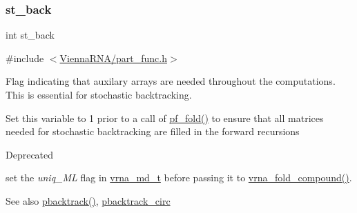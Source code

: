 \subsubsection{\texorpdfstring{st\+\_\+back}{st\_back}}
{\footnotesize\ttfamily int st\+\_\+back}



{\ttfamily \#include $<$\mbox{\hyperlink{part__func_8h}{Vienna\+R\+N\+A/part\+\_\+func.\+h}}$>$}



Flag indicating that auxilary arrays are needed throughout the computations. This is essential for stochastic backtracking. 

Set this variable to 1 prior to a call of \mbox{\hyperlink{group__pf__fold_gadc3db3d98742427e7001a7fd36ef28c2}{pf\+\_\+fold()}} to ensure that all matrices needed for stochastic backtracking are filled in the forward recursions

\begin{DoxyRefDesc}{Deprecated}
\item[\mbox{\hyperlink{deprecated__deprecated000102}{Deprecated}}]set the {\itshape uniq\+\_\+\+ML} flag in \mbox{\hyperlink{group__model__details_ga1f8a10e12a0a1915f2a4eff0b28ea17c}{vrna\+\_\+md\+\_\+t}} before passing it to \mbox{\hyperlink{group__fold__compound_ga6601d994ba32b11511b36f68b08403be}{vrna\+\_\+fold\+\_\+compound()}}.\end{DoxyRefDesc}


\begin{DoxySeeAlso}{See also}
\mbox{\hyperlink{group__subopt__stochbt_gac03ca6db186bb3bf0a2a326d7fb3ba03}{pbacktrack()}}, \mbox{\hyperlink{group__subopt__stochbt_ga00474051204ac9ad576b3e45174d03ff}{pbacktrack\+\_\+circ}} 
\end{DoxySeeAlso}
